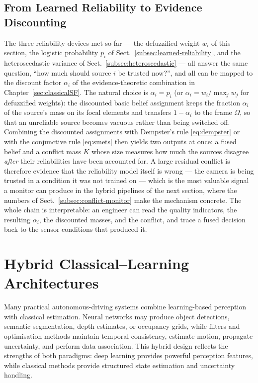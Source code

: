 \subsection{From Learned Reliability to Evidence Discounting}
\label{subsec:reliability-to-discounting}
The three reliability devices met so far --- the defuzzified weight $w_i$ of this section, the logistic probability $p_i$ of Sect.~\ref{subsec:learned-reliability}, and the heteroscedastic variance of Sect.~\ref{subsec:heteroscedastic} --- all answer the same question, ``how much should source $i$ be trusted now?'', and all can be mapped to the discount factor $\alpha_i$ of the evidence-theoretic combination in Chapter~\ref{sec:classicalSF}. The natural choice is $\alpha_i=p_i$ (or $\alpha_i=w_i/\max_j w_j$ for defuzzified weights): the discounted basic belief assignment keeps the fraction $\alpha_i$ of the source's mass on its focal elements and transfers $1-\alpha_i$ to the frame $\Omega$, so that an unreliable source becomes vacuous rather than being switched off. Combining the discounted assignments with Dempster's rule \eqref{eq:dempster} or with the conjunctive rule \eqref{eq:smets} then yields two outputs at once: a fused belief and a conflict mass $K$ whose size measures how much the sources disagree \emph{after} their reliabilities have been accounted for. A large residual conflict is therefore evidence that the reliability model itself is wrong --- the camera is being trusted in a condition it was not trained on --- which is the most valuable signal a monitor can produce in the hybrid pipelines of the next section, where the numbers of Sect.~\ref{subsec:conflict-monitor} make the mechanism concrete. The whole chain is interpretable: an engineer can read the quality indicators, the resulting $\alpha_i$, the discounted masses, and the conflict, and trace a fused decision back to the sensor conditions that produced it.

\section{Hybrid Classical--Learning Architectures}

Many practical autonomous-driving systems combine learning-based perception with classical estimation. Neural networks may produce object detections, semantic segmentation, depth estimates, or occupancy grids, while filters and optimisation methods maintain temporal consistency, estimate motion, propagate uncertainty, and perform data association. This hybrid design reflects the strengths of both paradigms: deep learning provides powerful perception features, while classical methods provide structured state estimation and uncertainty handling.

